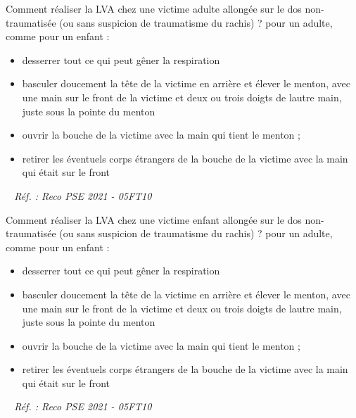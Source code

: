 \documentclass[grid,avery5371,landscape]{flashcards}
\makeatletter
\newcounter{nocarte}
\newcommand{\categ}[1]{%
  \def\@categ{#1}%
  \setcounter{nocarte}{0}%
}
\newcommand{\source}[1]{%
  \medskip
  \itshape%
   ~ \hfill Réf. : #1}
\makeatother
\begin{document}
\color[HTML]{003273}
\categ{PSE}
\begin{flashcard}[geste]{
 Comment réaliser la LVA chez une victime adulte allongée sur le dos non-traumatisée (ou sans suspicion de traumatisme du rachis) ?   }
  pour un adulte, comme pour un enfant : \begin{itemize}
\item desserrer tout ce qui peut gêner la respiration
\item basculer doucement la tête de la victime en arrière et élever le menton, avec une main sur le front de la victime et deux ou trois doigts de lautre main, juste sous la pointe du menton
\item ouvrir la bouche de la victime avec la main qui tient le menton ;
\item  retirer les éventuels corps étrangers  de la bouche de la victime avec la main qui était sur le front
\end{itemize}
  \source{Reco PSE 2021 - 05FT10}
\end{flashcard}


\color[HTML]{003273}
\categ{PSE}
\begin{flashcard}[geste]{
 Comment réaliser la LVA chez une victime enfant allongée sur le dos non-traumatisée (ou sans suspicion de traumatisme du rachis) ?   }
  pour un adulte, comme pour un enfant : \begin{itemize}
\item desserrer tout ce qui peut gêner la respiration
\item basculer doucement la tête de la victime en arrière et élever le menton, avec une main sur le front de la victime et deux ou trois doigts de lautre main, juste sous la pointe du menton
\item ouvrir la bouche de la victime avec la main qui tient le menton ;
\item  retirer les éventuels corps étrangers  de la bouche de la victime avec la main qui était sur le front
\end{itemize}
  \source{Reco PSE 2021 - 05FT10}
\end{flashcard}
\end{document}
